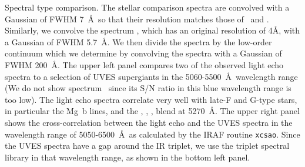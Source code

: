 {  Spectral
  type comparison. The stellar comparison spectra are convolved with a
  Gaussian of FWHM 7~\AA\ so that their resolution matches those 
  of \specMlo\ and \specDP. Similarly, we convolve
  the spectrum \specMhi, which has an original resolution of 4\AA,
  with a Gaussian of FWHM 5.7~\AA. We then divide the spectra by
  the low-order continuum which we determine by convolving the spectra
  with a Gaussian of FWHM 200~\AA. The upper left panel
  compares two of the observed light echo
  spectra to a selection of UVES supergiants\cite{Bagnulo03} in the 5060-5500~\AA\
  wavelength range (We do not show spectrum \specMhi\ since its S/N
  ratio in this blue wavelength range is too low).  The light echo
  spectra correlate very well with late-F and G-type stars, in
  particular the Mg~b lines, and the , ,
  ,  blend at 5270~\AA. The upper right panel
  shows the cross-correlation between the light echo and the UVES
  spectra in the wavelength range of 5050-6500~\AA\  
  as calculated by
  the IRAF routine {\tt xcsao}.
%
  Since the UVES spectra have a gap around the \ion{Ca}{II}
  IR triplet, we use the \ion{Ca}{II} triplet spectral
  library\cite{Cenarro01} in that wavelength range, as shown in the
  bottom left panel.
}
